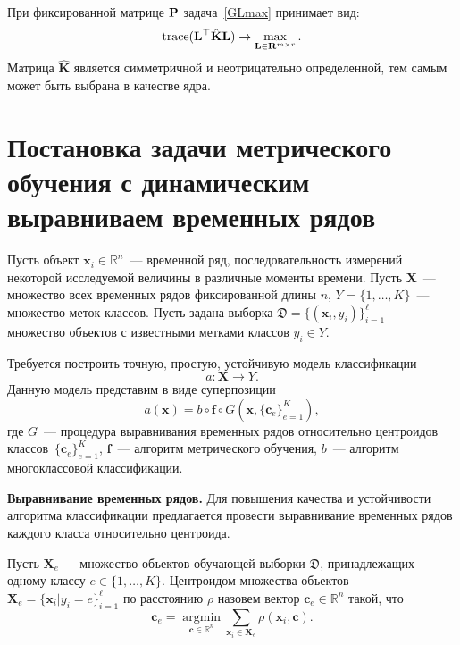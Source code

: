 При фиксированной матрице $\mathbf{P}$ задача~\eqref{GLmax} принимает вид:
\begin{equation*}
\text{trace} (\mathbf{L}^{\top} \hat{\mathbf{K}} \mathbf{L}) \to \max_{\mathbf{L} \in \mathbf{R}^{m \times r}}.
\end{equation*}
Матрица $\hat{\mathbf{K}}$ является симметричной и неотрицательно определенной, тем самым может быть выбрана в качестве ядра.

\section{Постановка задачи метрического обучения с динамическим выравниваем временных рядов}
Пусть объект $\mathbf{x}_i \in \mathbb{R}^n$~--- временной ряд, последовательность измерений некоторой исследуемой величины в различные моменты времени.
Пусть $\mathbf{X}$~--- множество всех временных рядов фиксированной длины $n$, $Y = \{1, \dots, K\}$~--- множество меток классов.
Пусть задана выборка $\mathfrak{D} = \{(\mathbf{x}_i, y_i)\}_{i=1}^\ell$~--- множество объектов с известными метками классов $y_i \in Y$.

Требуется построить точную, простую, устойчивую модель классификации
\[
a: \mathbf{X} \to Y.
\]
Данную модель представим в виде суперпозиции
\begin{equation}
\label{ch4:eq:classifiers}
a(\mathbf{x}) = b \circ \mathbf{f} \circ G(\mathbf{x}, \{\mathbf{c}_e\}_{e = 1} ^ K),
\end{equation}
где $G$~--- процедура выравнивания временных рядов относительно центроидов классов~$\{\mathbf{c}_e\}_{e = 1} ^ K$, $\mathbf{f}$~--- алгоритм метрического обучения, $b$~--- алгоритм многоклассовой классификации.

\textbf{Выравнивание временных рядов.}
Для повышения качества и устойчивости алгоритма классификации предлагается провести выравнивание временных рядов каждого класса относительно центроида.

Пусть $\mathbf{X}_e$ --- множество объектов обучающей выборки $\mathfrak{D}$, принадлежащих одному классу $e \in \{1, \dots, K\}$.
Центроидом множества объектов $\mathbf{X}_e = \{\mathbf{x}_i|y_i=e\}_{i=1}^\ell$ по расстоянию $\rho$ назовем вектор $\mathbf{c}_e \in \mathbb{R}^n$ такой, что
\begin{equation}
\label{centroid_task}
\mathbf{c}_e = \mathop{\text{argmin}}\limits_{{\mathbf{c} \in \mathbb{R}^n}}\sum_{\mathbf{x}_i \in \mathbf{X}_e}
{\rho(\mathbf{x}_i ,\mathbf{c})}.
\end{equation}

